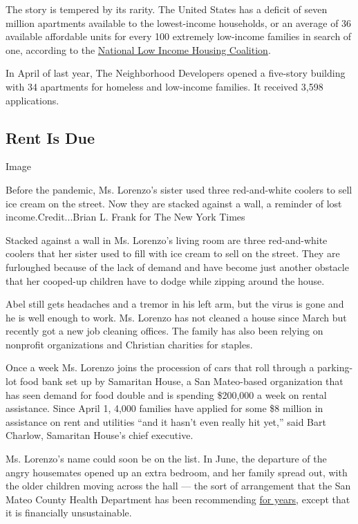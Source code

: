 The story is tempered by its rarity. The United States has a deficit of
seven million apartments available to the lowest-income households, or
an average of 36 available affordable units for every 100 extremely
low-income families in search of one, according to the
\href{https://reports.nlihc.org/sites/default/files/gap/Gap-Report_2019.pdf}{National
Low Income Housing Coalition}.

In April of last year, The Neighborhood Developers opened a five-story
building with 34 apartments for homeless and low-income families. It
received 3,598 applications.

\hypertarget{rent-is-due}{%
\subsection{Rent Is Due}\label{rent-is-due}}

Image

Before the pandemic, Ms. Lorenzo's sister used three red-and-white
coolers to sell ice cream on the street. Now they are stacked against a
wall, a reminder of lost income.Credit...Brian L. Frank for The New York
Times

Stacked against a wall in Ms. Lorenzo's living room are three
red-and-white coolers that her sister used to fill with ice cream to
sell on the street. They are furloughed because of the lack of demand
and have become just another obstacle that her cooped-up children have
to dodge while zipping around the house.

Abel still gets headaches and a tremor in his left arm, but the virus is
gone and he is well enough to work. Ms. Lorenzo has not cleaned a house
since March but recently got a new job cleaning offices. The family has
also been relying on nonprofit organizations and Christian charities for
staples.

Once a week Ms. Lorenzo joins the procession of cars that roll through a
parking-lot food bank set up by Samaritan House, a San Mateo-based
organization that has seen demand for food double and is spending
\$200,000 a week on rental assistance. Since April 1, 4,000 families
have applied for some \$8 million in assistance on rent and utilities
``and it hasn't even really hit yet,'' said Bart Charlow, Samaritan
House's chief executive.

Ms. Lorenzo's name could soon be on the list. In June, the departure of
the angry housemates opened up an extra bedroom, and her family spread
out, with the older children moving across the hall --- the sort of
arrangement that the San Mateo County Health Department has been
recommending \href{http://www.gethealthysmc.org/healthy-housing}{for
years}, except that it is financially unsustainable.

